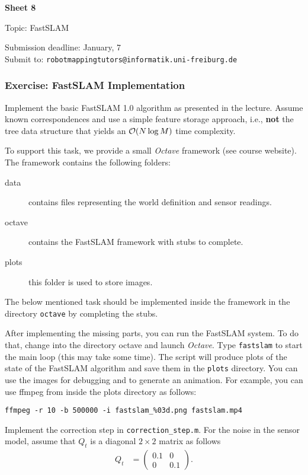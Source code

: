 \documentclass[12pt]{article}
\begin{document}


\begin{center}
{\bf \Large Sheet 8}

{\large Topic: FastSLAM}

Submission deadline: January, 7\\
Submit to: \texttt{robotmappingtutors@informatik.uni-freiburg.de}
\end{center}

\subsubsection*{Exercise: FastSLAM Implementation}

Implement the basic FastSLAM 1.0 algorithm as presented in the lecture.
Assume known correspondences and use a simple feature storage approach,
i.e., {\bf not} the tree data structure that yields an ${\cal O}(N \log
M)$ time complexity.

To support this task, we provide a small \emph{Octave} framework (see
course website).  The framework contains the following folders:

\begin{description}
\item [data]
  contains files representing the world definition and sensor readings.
\item [octave]
  contains the FastSLAM framework with stubs  to complete.
\item [plots]
  this folder is used to store images.
\end{description}

The below mentioned task should be implemented inside the framework in
the directory \texttt{octave} by completing the stubs.

After implementing the missing parts, you can run the FastSLAM system.
To do that, change into the directory octave and launch \emph{Octave}.
Type \texttt{fastslam} to start the main loop (this may take some time).
The script will produce plots of the state of the FastSLAM algorithm and
save them in the \texttt{plots} directory.  You can use the images for
debugging and to generate an animation. For example, you can use ffmpeg
from inside the plots directory as follows:
\begin{verbatim}
ffmpeg -r 10 -b 500000 -i fastslam_%03d.png fastslam.mp4
\end{verbatim}

Implement the correction step in \texttt{correction\_step.m}.  For the
noise in the sensor model, assume that $Q_t$ is a diagonal $2 \times 2$
matrix as follows
\begin{align*}
  Q_t &= \begin{pmatrix} 0.1 & 0 \\ 0 & 0.1 \end{pmatrix}.
\end{align*}
\end{document}
